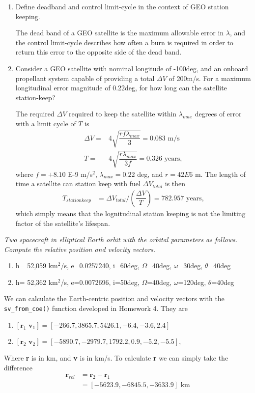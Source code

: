 \documentclass[onecolumn,10pt]{jhwhw}
\begin{document}
\begin{enumerate}
\item Define deadband and control limit-cycle in the context of GEO station keeping.

The dead band of a GEO satellite is the maximum allowable error in $\lambda$, and the control limit-cycle describes how often a burn is required in order to return this error to the opposite side of the dead band.

\item Consider a GEO satellite with nominal longitude of -100deg, and an onboard propellant system capable of providing a total $\Delta V$ of 200m/s. For a maximum longitudinal error magnitude of 0.22deg, for how long can the satellite station-keep?

The required $\Delta V$ required to keep the satellite within $\lambda_{max}$ degrees of error with a limit cycle of $T$ is
\begin{align*}
\Delta V =& 4 \sqrt{\dfrac{rf \lambda_{max}}{3}} = 0.083 \mbox{ m/s}\\
       T =& 4 \sqrt{\dfrac{r \lambda_{max}}{3f}} = 0.326 \mbox{ years},
\end{align*}
where $f = +8.10$ E-9 m/s$^2$, $\lambda_{max} = 0.22$ deg, and $r = 42E6$ m. The length of time a satellite can station keep with fuel $\Delta V_{total}$ is then
\begin{align*}
T_{station keep} &= \Delta V_{total} / \left( \dfrac{\Delta V}{T} \right) = 782.957 \mbox{ years},
\end{align*}
which simply means that the lognitudinal station keeping is not the limiting factor of the satellite's lifespan.
\end{enumerate}
\clearpage

\problem{}
\textit{Two spacecraft in elliptical Earth orbit with the orbital parameters as follows. Compute the relative position and velocity vectors.}
\begin{enumerate}
\itemsep0em
\item h= 52,059 km$^2$/s, e=0.0257240, i=60deg, $\Omega$=40deg, $\omega$=30deg, $\theta$=40deg
\item h= 52,362 km$^2$/s, e=0.0072696, i=50deg, $\Omega$=40deg, $\omega$=120deg, $\theta$=40deg
\end{enumerate}

We can calculate the Earth-centric position and velocity vectors with the \verb|sv_from_coe()| function developed in Homework 4. They are
\begin{enumerate}
\itemsep0em
\item $[\textbf{r}_1 \textbf{ v}_1] = [-266.7,  3865.7,  5426.1, -6.4 , -3.6,  2.4]$
\item $[\textbf{r}_2 \textbf{ v}_2] = [-5890.7, -2979.7,  1792.2, 0.9, -5.2, -5.5]$,
\end{enumerate}
Where \textbf{r} is in km, and \textbf{v} is in km/s. To calculate \textbf{r} we can simply take the difference
\begin{align*}
   \textbf{r}_{rel} &= \textbf{r}_2 - \textbf{r}_1 \\
                    &= [-5623.9, -6845.5, -3633.9] \mbox{ km}
\end{align*}
\end{document}
